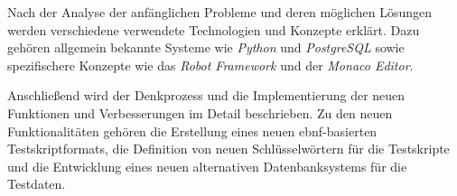 Nach der Analyse der anfänglichen Probleme und deren möglichen Lösungen werden verschiedene verwendete Technologien und Konzepte erklärt. Dazu gehören allgemein bekannte Systeme wie \textit{Python} und \textit{PostgreSQL} sowie spezifischere Konzepte wie das \textit{Robot Framework} und der \textit{Monaco Editor}.

Anschließend wird der Denkprozess und die Implementierung der neuen Funktionen und Verbesserungen im Detail beschrieben. Zu den neuen Funktionalitäten gehören die Erstellung eines neuen \gls{ebnf}-basierten Testskriptformats, die Definition von neuen Schlüsselwörtern für die Testskripte und die Entwicklung eines neuen alternativen Datenbanksystems für die Testdaten.
